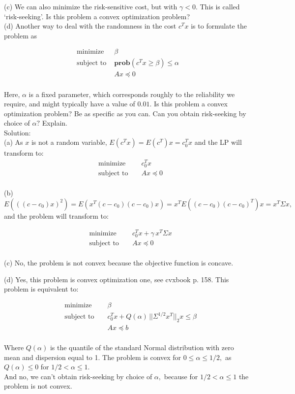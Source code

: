 \documentclass{article}
\begin{document}
(c) We can also minimize the risk-sensitive cost, but with $
\gamma < 0.$ This is called `risk-seeking'. Is this problem a convex optimization problem? \\

(d) Another way to deal with the randomness in the cost $c^T x$ is to formulate the problem as 

\begin{align*}
\text{minimize } &\beta \\
\text{subject to } &\boldsymbol{prob}(c^T x \geq \beta ) \leq \alpha \\
&A x \preceq 0 \\
\end{align*} 

Here, $\alpha$ is a fixed parameter, which corresponds roughly to the reliability we require, and might typically have a value of $0.01$. Is this problem a convex optimization problem? Be as specific as you can. Can you obtain risk-seeking by choice of $\alpha?$ Explain. \\

Solution: \\

(a) As $x$ is not a random variable, $E(c^T x) = E(c^T) x = c_0^T x$
and the LP will transform to:
\begin{align*}
&\text{minimize } &&c_0^T x \\
&\text{subject to } &&A x \preceq 0 \\
\end{align*} 

(b) $E(((c - c_0)x)^2) = E(x^T(c - c_0)(c - c_0) x) = 
x^TE((c - c_0)(c - c_0)^T)x = x^T \Sigma x,$ and the problem will transform to:

\begin{align*}
&\text{minimize } &&c_0^T x + \gamma \, x^T \Sigma x \\
&\text{subject to } &&A x \preceq 0 \\
\end{align*} 

(c) No, the problem is not convex because the objective function is concave.

(d)
Yes, this problem is convex optimization one,  see cvxbook p. 158. This problem is equivalent to:

\begin{align*}
&\text{minimize } && \beta \\
&\text{subject to } && c_0^T x + Q(\alpha) \, 
||\Sigma^{1/2} x^T||_2 x \leq \beta\\
& &&A x \preceq b \\
\end{align*} 

Where $Q(\alpha)$ is the quantile of the standard Normal distribution with zero mean and dispersion equal to 1. 
The problem is convex for $0 \leq \alpha \leq 1/2,$ as $Q(\alpha) \leq 0$ for $1/2 < \alpha \leq 1.$
\\
And no, we can't obtain risk-seeking by choice of $\alpha,$ because for  $1/2 < \alpha \leq 1$ the problem is not convex.
\end{document}
